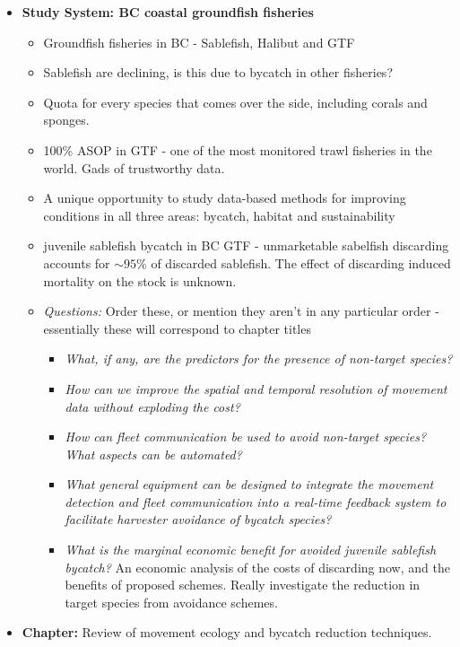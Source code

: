 \documentclass{article}
\newcommand{\sj}[1]{{\color{red}\mbox{}\marginpar{\raggedleft\hspace{0pt}*} #1}}
\begin{document}
\begin{itemize}
\begin{itemize}
    \end{itemize}
  \item {\bf Study System: BC coastal groundfish fisheries}          
    \begin{itemize}
      \item Groundfish fisheries in BC - Sablefish, Halibut and GTF
      \item Sablefish are declining, is this due to bycatch in other fisheries?
      \item Quota for every species that comes over the side, including corals and sponges.
      \item 100\% ASOP in GTF - one of the most monitored trawl fisheries in the world. Gads of trustworthy data.
      \item A unique opportunity to study data-based methods for improving conditions in all three areas: bycatch, habitat and sustainability
      \item juvenile sablefish bycatch in BC GTF - unmarketable sabelfish discarding accounts for $\sim 95\%$ of discarded sablefish. The effect of discarding induced mortality on the stock is unknown.
      \item {\it Questions:} \sj{Order these, or mention they aren't in any particular order - essentially these will correspond to chapter titles}
        \begin{itemize}
          \item {\it What, if any, are the predictors for the presence of non-target species?}
          \item {\it How can we improve the spatial and temporal resolution of movement data without exploding the cost?}
          \item {\it How can fleet communication be used to avoid non-target species? What aspects can be automated?}
          \item {\it What general equipment can be designed to integrate the movement detection and fleet communication into a real-time feedback system to facilitate harvester avoidance of bycatch species?}
          \item {\it What is the marginal economic benefit for avoided juvenile sablefish bycatch?} \sj{An economic analysis of the costs of discarding now, and the benefits of proposed schemes. Really investigate the reduction in target species from avoidance schemes.}
        \end{itemize}
    \end{itemize}
  \item {\bf Chapter:} Review of movement ecology and bycatch reduction techniques.

\end{itemize}
\end{document}
